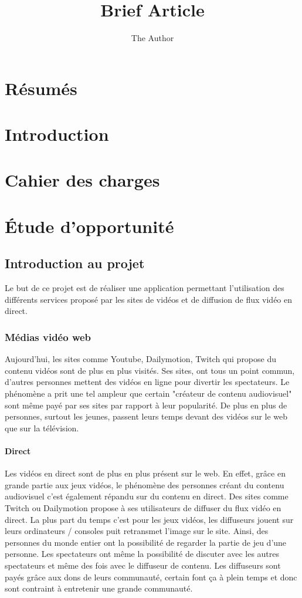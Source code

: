 \documentclass[11pt]{report} %
\title{Brief Article}
\author{The Author}
\begin{document}
\maketitle

\chapter{Résumés}

\chapter{Introduction}

\chapter{Cahier des charges}

\chapter{Étude d'opportunité}
\newpage

	\section{Introduction au projet}
	Le but de ce projet est de réaliser une application permettant l'utilisation des différents services proposé par les sites de vidéos et de diffusion de flux vidéo en direct.
		\subsection{Médias vidéo web}
		 Aujourd'hui, les sites comme Youtube, Dailymotion, Twitch qui propose du contenu vidéos sont de plus en plus visités. Ses sites, ont tous un point commun, d'autres personnes mettent des vidéos en ligne pour divertir les spectateurs. Le phénomène a prit une tel ampleur que certain "créateur de contenu audiovisuel" sont même 	payé par ses sites par rapport à leur popularité. De plus en plus de personnes, surtout les jeunes, passent leurs temps devant des vidéos sur le web que sur la télévision.
			\subsubsection{Direct}
			Les vidéos en direct sont de plus en plus présent sur le web. En effet, grâce en grande partie aux jeux vidéos, le phénomène des personnes créant du contenu audiovisuel c'est également répandu sur du contenu en direct. Des sites comme Twitch ou Dailymotion propose à ses utilisateurs de diffuser du flux vidéo en direct. La plus part du temps c'est pour les jeux vidéos, les diffuseurs jouent sur leurs ordinateurs / consoles puit retransmet l'image sur le site. Ainsi, des personnes du monde entier ont la possibilité de regarder la partie de jeu d'une personne. Les spectateurs ont même la possibilité de discuter avec les autres spectateurs et même des fois avec le diffuseur de contenu.
Les diffuseurs sont payés grâce aux dons de leurs communauté, certain font ça à plein temps et donc sont contraint à entretenir une grande communauté.
\end{document}
